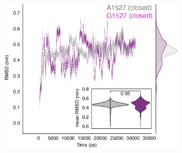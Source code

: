 \begin{figure}[H]
\begin{subfigure}[t]{0.165\textwidth}
    \end{subfigure}
    \hspace{0.01\textwidth} %
    \begin{subfigure}[t]{0.32\textwidth}
        \caption{}
        \includegraphics[width=\textwidth]{./main_plots/variant_dynamics.png}        
    \end{subfigure}
    \begin{subfigure}[t]{0.16\textwidth}
        \caption{}

\end{subfigure}
\end{figure}
